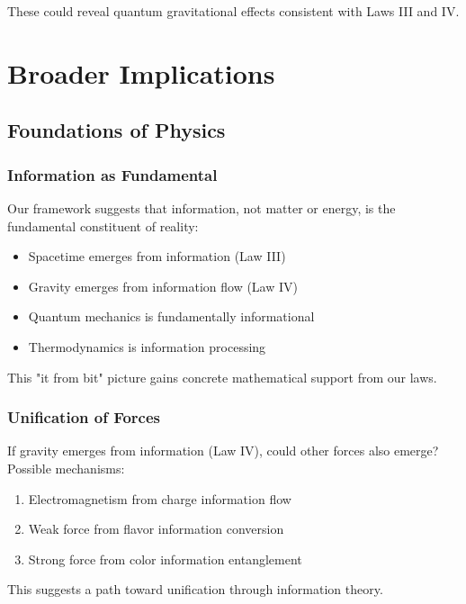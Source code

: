 \documentclass[11pt,a4paper]{article}
\theoremstyle{plain}
\theoremstyle{definition}
\theoremstyle{remark}
\begin{document}
These could reveal quantum gravitational effects consistent with Laws III and IV.

\section{Broader Implications}
\label{sec:implications}

\subsection{Foundations of Physics}

\subsubsection{Information as Fundamental}

Our framework suggests that information, not matter or energy, is the fundamental constituent of reality:

\begin{itemize}[leftmargin=*]
\item Spacetime emerges from information (Law III)
\item Gravity emerges from information flow (Law IV)
\item Quantum mechanics is fundamentally informational
\item Thermodynamics is information processing
\end{itemize}

This "it from bit" picture \cite{wheeler1990information} gains concrete mathematical support from our laws.

\subsubsection{Unification of Forces}

If gravity emerges from information (Law IV), could other forces also emerge? Possible mechanisms:

\begin{enumerate}[leftmargin=*]
\item Electromagnetism from charge information flow
\item Weak force from flavor information conversion
\item Strong force from color information entanglement
\end{enumerate}

This suggests a path toward unification through information theory.
\end{document}
